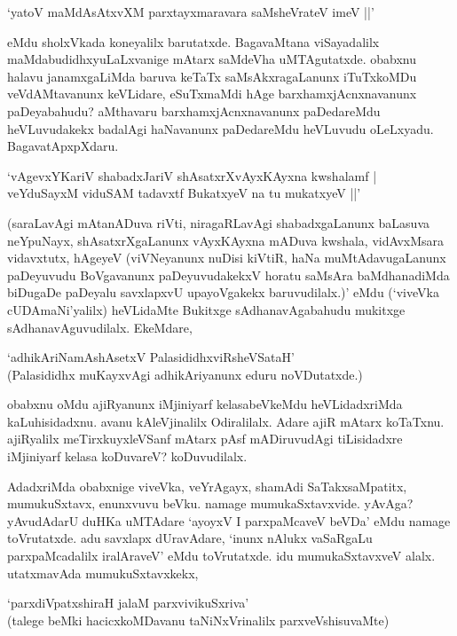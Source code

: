 \begin{shloka}
`yatoV maMdAsAtxvXM parxtayxmaravara saMsheVrateV imeV ||'
\end{shloka}

eMdu sholxVkada koneyalilx barutatxde. BagavaMtana viSayadalilx maMdabudidhxyuLaLxvanige mAtarx saMdeVha uMTAgutatxde. obabxnu halavu janamxgaLiMda baruva keTaTx saMsAkxragaLanunx iTuTxkoMDu veVdAMtavanunx keVLidare, eSuTxmaMdi hAge barxhamxjAcnxnavanunx paDeyabahudu? aMthavaru barxhamxjAcnxnavanunx paDedareMdu heVLuvudakekx badalAgi haNavanunx paDedareMdu heVLuvudu oLeLxyadu. BagavatApxpXdaru.

\begin{shloka}
`vAgevxYKariV shabadxJariV shAsatxrXvAyxKAyxna kwshalamf |\\
veYduSayxM viduSAM tadavxtf BukatxyeV na tu mukatxyeV ||'
\end{shloka}

(saraLavAgi mAtanADuva riVti, niragaRLavAgi shabadxgaLanunx baLasuva neYpuNayx, shAsatxrXgaLanunx vAyxKAyxna mADuva kwshala, vidAvxMsara vidavxtutx, hAgeyeV (viVNeyanunx nuDisi kiVtiR, haNa muMtAdavugaLanunx paDeyuvudu BoVgavanunx paDeyuvudakekxV horatu saMsAra baMdhanadiMda biDugaDe paDeyalu savxlapxvU upayoVgakekx baruvudilalx.)' eMdu (`viveVka cUDAmaNi'yalilx) heVLidaMte Bukitxge sAdhanavAgabahudu mukitxge sAdhanavAguvudilalx. EkeMdare,

\begin{shloka}
`adhikAriNamAshAsetxV PalasididhxviRsheVSataH'\\
(Palasididhx muKayxvAgi adhikAriyanunx eduru noVDutatxde.)
\end{shloka}

obabxnu oMdu ajiRyanunx iMjiniyarf kelasabeVkeMdu heVLidadxriMda kaLuhisidadxnu. avanu kAleVjinalilx Odiralilalx. Adare ajiR mAtarx koTaTxnu. ajiRyalilx meTirxkuyxleVSanf mAtarx pAsf mADiruvudAgi tiLisidadxre iMjiniyarf kelasa koDuvareV? koDuvudilalx.

AdadxriMda obabxnige viveVka, veYrAgayx, shamAdi SaTakxsaMpatitx, mumukuSxtavx, enunxvuvu beVku. namage mumukaSxtavxvide. yAvAga? yAvudAdarU duHKa uMTAdare `ayoyxV I parxpaMcaveV beVDa' eMdu namage toVrutatxde. adu savxlapx dUravAdare, `inunx nAlukx vaSaRgaLu parxpaMcadalilx iralAraveV' eMdu toVrutatxde. idu mumukaSxtavxveV alalx. utatxmavAda mumukuSxtavxkekx,

\begin{shloka}
`parxdiVpatxshiraH jalaM parxvivikuSxriva'\\
(talege beMki hacicxkoMDavanu taNiNxVrinalilx parxveVshisuvaMte)
\end{shloka}

